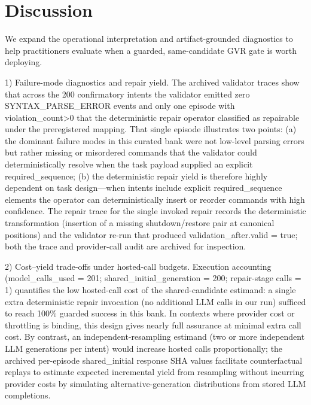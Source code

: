 \documentclass[conference]{IEEEtran}
\begin{document}
\section{Discussion}
We expand the operational interpretation and artifact-grounded diagnostics to help practitioners evaluate when a guarded, same-candidate GVR gate is worth deploying.

1) Failure-mode diagnostics and repair yield. The archived validator traces show that across the 200 confirmatory intents the validator emitted zero SYNTAX\_PARSE\_ERROR events and only one episode with violation\_count>0 that the deterministic repair operator classified as repairable under the preregistered mapping. That single episode illustrates two points: (a) the dominant failure modes in this curated bank were not low-level parsing errors but rather missing or misordered commands that the validator could deterministically resolve when the task payload supplied an explicit required\_sequence; (b) the deterministic repair yield is therefore highly dependent on task design---when intents include explicit required\_sequence elements the operator can deterministically insert or reorder commands with high confidence. The repair trace for the single invoked repair records the deterministic transformation (insertion of a missing shutdown/restore pair at canonical positions) and the validator re-run that produced validation\_after.valid = true; both the trace and provider-call audit are archived for inspection.

2) Cost--yield trade-offs under hosted-call budgets. Execution accounting (model\_calls\_used = 201; shared\_initial\_generation = 200; repair-stage calls = 1) quantifies the low hosted-call cost of the shared-candidate estimand: a single extra deterministic repair invocation (no additional LLM calls in our run) sufficed to reach 100\% guarded success in this bank. In contexts where provider cost or throttling is binding, this design gives nearly full assurance at minimal extra call cost. By contrast, an independent-resampling estimand (two or more independent LLM generations per intent) would increase hosted calls proportionally; the archived per-episode shared\_initial response SHA values facilitate counterfactual replays to estimate expected incremental yield from resampling without incurring provider costs by simulating alternative-generation distributions from stored LLM completions.
\end{document}
